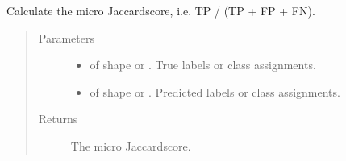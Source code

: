 \documentclass[letterpaper,10pt,english]{sphinxmanual}
\begin{document}
\begin{fulllineitems}
\label{\detokenize{pusion.evaluation.evaluation_metrics:pusion.evaluation.evaluation_metrics.micro_jaccard}}
\sphinxAtStartPar
Calculate the micro Jaccard\sphinxhyphen{}score, i.e. TP / (TP + FP + FN).
\begin{quote}\begin{description}
\item[{Parameters}] \leavevmode\begin{itemize}
\item {} 
\sphinxAtStartPar
{} \textendash{}  of shape  or . True labels or class assignments.

\item {} 
\sphinxAtStartPar
{} \textendash{}  of shape  or . Predicted labels or
class assignments.

\end{itemize}

\item[{Returns}] \leavevmode
\sphinxAtStartPar
The micro Jaccard\sphinxhyphen{}score.

\end{description}\end{quote}

\end{fulllineitems}

\end{document}
